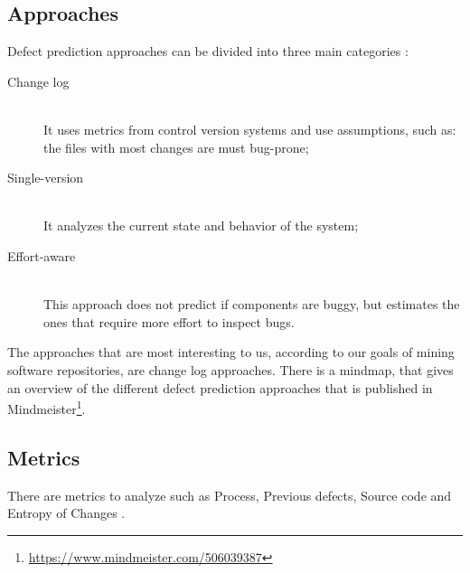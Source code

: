 \subsection{Approaches}
Defect prediction approaches can be divided into three main categories
\cite{D'Ambros:2012:EDP:2318097.2318149}:


\begin{description}
  \item[Change log] \hfill \\
  It uses metrics from control version systems and use assumptions, such as:
  the files with most changes are must bug-prone;
  \item[Single-version] \hfill \\
  It analyzes the current state and behavior of the system;
  \item[Effort-aware]  \hfill \\  This approach does not predict if components
  are buggy, but estimates the ones that require more effort to inspect bugs.
\end{description}

The approaches that are most interesting to us, according to our goals of mining
software repositories, are change log approaches. There is a mindmap, that
gives an overview of the different defect prediction approaches that is
published in Mindmeister\footnote{\url{https://www.mindmeister.com/506039387}}.

\subsection{Metrics}
There are metrics to analyze such as Process, Previous defects, Source code and
Entropy of Changes \cite{D'Ambros:2012:EDP:2318097.2318149}.

